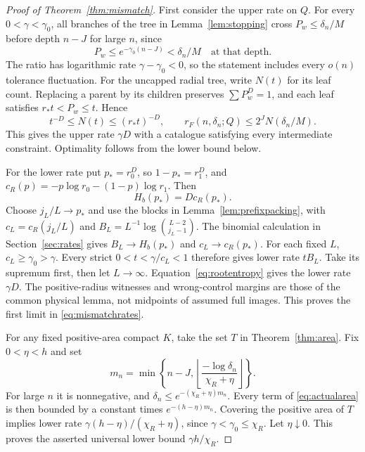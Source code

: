 \documentclass[11pt]{amsart}
\theoremstyle{definition}
\theoremstyle{remark}
\numberwithin{equation}{section}
\begin{document}
\begin{proof}[Proof of Theorem~\ref{thm:mismatch}]
First consider the upper rate on $Q$. For every $0<\gamma<\gamma_0$,
all branches of the tree in Lemma~\ref{lem:stopping} cross
$P_w\le\delta_n/M$ before depth $n-J$ for large $n$, since
\[
P_w\le e^{-\gamma_0(n-J)}<\delta_n/M
       \quad\text{at that depth}.
\]
The ratio has logarithmic rate $\gamma-\gamma_0<0$, so the
statement includes every $o(n)$ tolerance fluctuation.
For the uncapped radial tree, write $N(t)$ for its leaf count.
Replacing a parent by its children preserves $\sum P_w^D=1$,
and each leaf satisfies $r_*t<P_w\le t$. Hence
\begin{equation}\label{eq:mismatchtree}
t^{-D}\le N(t)\le(r_*t)^{-D},\qquad
r_F(n,\delta_n;Q)\le2^JN(\delta_n/M).
\end{equation}
This gives the upper rate $\gamma D$ with a catalogue satisfying
every intermediate constraint. Optimality follows from the lower
bound below.

For the lower rate put $p_*=r_0^D$, so $1-p_*=r_1^D$, and
$c_R(p)=-p\log r_0-(1-p)\log r_1$. Then
\begin{equation}\label{eq:rootentropy}
H_b(p_*)=D c_R(p_*).
\end{equation}
Choose $j_L/L\to p_*$ and use the blocks in
Lemma~\ref{lem:prefixpacking}, with
$c_L=c_R(j_L/L)$ and $B_L=L^{-1}\log\binom{L-2}{j_L-1}$.
The binomial calculation in Section~\ref{sec:rates} gives
$B_L\to H_b(p_*)$ and $c_L\to c_R(p_*)$.
For each fixed $L$, $c_L\ge\gamma_0>\gamma$.
Every strict $0<t<\gamma/c_L<1$ therefore gives lower rate $tB_L$.
Take its supremum first, then let $L\to\infty$.
Equation~\eqref{eq:rootentropy} gives the lower rate $\gamma D$.
The positive-radius witnesses and wrong-control margins are those
of the common physical lemma, not midpoints of assumed full images.
This proves the first limit in \eqref{eq:mismatchrates}.

For any fixed positive-area compact $K$, take the set $T$ in
Theorem~\ref{thm:area}. Fix $0<\eta<h$ and set
\[
m_n=\min\left\{n-J,
       \left\lfloor\frac{-\log\delta_n}{\chi_R+\eta}\right\rfloor\right\}.
\]
For large $n$ it is nonnegative, and
$\delta_n\le e^{-(\chi_R+\eta)m_n}$.
Every term of \eqref{eq:actualarea} is then bounded by a constant
times $e^{-(h-\eta)m_n}$. Covering the positive area of $T$ implies
lower rate $\gamma(h-\eta)/(\chi_R+\eta)$, since
$\gamma<\gamma_0\le\chi_R$. Let $\eta\downarrow0$.
This proves the asserted universal lower bound $\gamma h/\chi_R$.


\end{proof}
\end{document}
